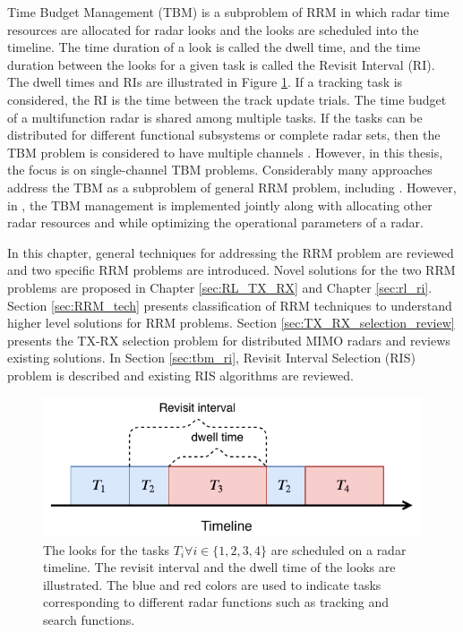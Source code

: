 \documentclass[english, 12pt, a4paper, elec, utf8, a-1b, online]{aaltothesis}
\numberwithin{equation}{section}
\begin{document}
Time Budget Management (TBM) is a subproblem of RRM in which radar time resources are allocated for radar looks and the looks are scheduled into the timeline. 
The time duration of a look is called the dwell time, and the time duration between the looks for a given task is called the Revisit Interval (RI). 
The dwell times and RIs are illustrated in Figure \ref{fig:timeline}. 
If a tracking task is considered, the RI is the time between the track update trials. 
The time budget of a multifunction radar is shared among multiple tasks.
If the tasks can be distributed for different functional subsystems or complete radar sets, then the TBM problem is considered to have multiple channels \cite{Shaghaghi2018}.
However, in this thesis, the focus is on single-channel TBM problems.
Considerably many approaches address the TBM as a subproblem of general RRM problem, including \cite{Koch1999, Wintenby2006, Byrne2016, Xu2010}. 
However, in \cite{Rajkumar1997, Irci2010, Charlish2015a}, the TBM management is implemented jointly along with allocating other radar resources and while optimizing the operational parameters of a radar.


In this chapter, general techniques for addressing the RRM problem are reviewed and two specific RRM problems are introduced.
Novel solutions for the two RRM problems are proposed in Chapter \ref{sec:RL_TX_RX} and Chapter \ref{sec:rl_ri}.
Section \ref{sec:RRM_tech} presents classification of RRM techniques to understand higher level solutions for RRM problems.
Section \ref{sec:TX_RX_selection_review} presents the TX-RX selection problem for distributed MIMO radars and reviews existing solutions. 
In Section \ref{sec:tbm_ri}, Revisit Interval Selection (RIS) problem is described and existing RIS algorithms are reviewed.


\begin{figure}[h]
    \centering
    \includegraphics{figures/timeline.pdf}
    \caption{
        The looks for the tasks $T_i \forall i\in\{1,2,3,4\}$ are scheduled on a radar timeline. 
        The revisit interval and the dwell time of the looks are illustrated.
        The blue and red colors are used to indicate tasks corresponding to different radar functions such as tracking and search functions.
    }
    \label{fig:timeline}
\end{figure}
\end{document}
